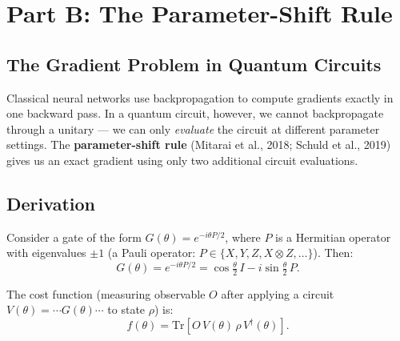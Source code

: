 \documentclass[a4paper,11pt]{article}
\begin{document}
\section{Part B: The Parameter-Shift Rule}
\label{sec:psr}

\subsection{The Gradient Problem in Quantum Circuits}

Classical neural networks use backpropagation to compute gradients exactly
in one backward pass. In a quantum circuit, however, we cannot backpropagate
through a unitary — we can only \emph{evaluate} the circuit at different
parameter settings. The \textbf{parameter-shift rule} (Mitarai et al., 2018;
Schuld et al., 2019) gives us an exact gradient using only two additional
circuit evaluations.

\subsection{Derivation}

Consider a gate of the form $G(\theta) = e^{-i\theta P/2}$, where $P$ is a
Hermitian operator with eigenvalues $\pm 1$ (a Pauli operator: $P \in
\{X, Y, Z, X\otimes Z, \ldots\}$). Then:
\begin{equation}
    G(\theta) = e^{-i\theta P/2} = \cos\!\tfrac{\theta}{2}\,I
    - i\sin\!\tfrac{\theta}{2}\,P.
\end{equation}

The cost function (measuring observable $O$ after applying a circuit
$V(\theta) = \cdots G(\theta) \cdots$ to state $\rho$) is:
\begin{equation}
    f(\theta) = \mathrm{Tr}\!\left[O\,V(\theta)\,\rho\,V^\dagger(\theta)\right].
\end{equation}
\end{document}
